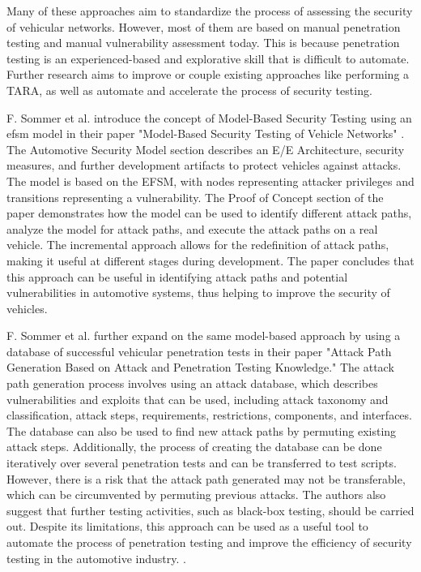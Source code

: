 Many of these approaches aim to standardize the process of assessing the security of vehicular networks. However, most of them are based on manual penetration testing and manual vulnerability assessment today. 
This is because penetration testing is an experienced-based and explorative skill that is difficult to automate. 
Further research aims to improve or couple existing approaches like performing a TARA, as well as automate and accelerate the process of security testing.

F. Sommer et al. introduce the concept of Model-Based Security Testing using an \gls{efsm} model in their paper "Model-Based Security Testing of Vehicle Networks" \cite{model_based_testing}.
The Automotive Security Model section describes an E/E Architecture, security measures, and further development artifacts to protect vehicles against attacks.
The model is based on the EFSM, with nodes representing attacker privileges and transitions representing a vulnerability.
The Proof of Concept section of the paper demonstrates how the model can be used to identify different \gls{attack path}s, analyze the model for attack paths, and execute the attack paths on a real vehicle. 
The incremental approach allows for the redefinition of attack paths, making it useful at different stages during development. 
The paper concludes that this approach can be useful in identifying attack paths and potential vulnerabilities in automotive systems, thus helping to improve the security of vehicles.

F. Sommer et al. further expand on the same model-based approach by using a database of successful vehicular penetration tests in their paper "Attack Path Generation Based on Attack and Penetration Testing Knowledge." 
The attack path generation process involves using an attack database, which describes vulnerabilities and exploits that can be used, including attack taxonomy and classification, attack steps, requirements, restrictions, components, and interfaces. 
The database can also be used to find new attack paths by permuting existing attack steps. 
Additionally, the process of creating the database can be done iteratively over several penetration tests and can be transferred to test scripts. 
However, there is a risk that the attack path generated may not be transferable, which can be circumvented by permuting previous attacks. 
The authors also suggest that further testing activities, such as black-box testing, should be carried out. 
Despite its limitations, this approach can be used as a useful tool to automate the process of penetration testing and improve the efficiency of security testing in the automotive industry. \cite{attack_database}.

